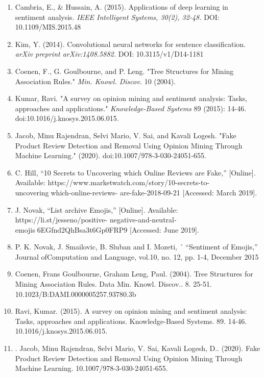 \begin{enumerate}
    \item Cambria, E., & Hussain, A. (2015). Applications of deep learning in sentiment analysis. \textit{IEEE Intelligent Systems, 30(2), 32-48.}  DOI: 10.1109/MIS.2015.48
    \item Kim, Y. (2014). Convolutional neural networks for sentence classification. \textit{arXiv preprint arXiv:1408.5882.}  DOI: 10.3115/v1/D14-1181
    \item Coenen, F., G. Goulbourne, and P. Leng. "Tree Structures for Mining Association Rules." \textit{Min. Knowl. Discov.} 10 (2004). 
    \item Kumar, Ravi. "A survey on opinion mining and sentiment analysis: Tasks, approaches and applications." \textit{Knowledge-Based Systems} 89 (2015): 14-46. doi:10.1016/j.knosys.2015.06.015.
    \item Jacob, Minu Rajendran, Selvi Mario, V. Sai, and Kavali Logesh. "Fake Product Review Detection and Removal Using Opinion Mining Through Machine Learning." (2020). doi:10.1007/978-3-030-24051-655.
    \item  C. Hill, “10 Secrets to Uncovering which
Online Reviews are Fake,” [Online]. Available:
https://www.marketwatch.com/story/10-secrets-to-uncoveringwhich-online-reviews- are-fake-2018-09-21 [Accessed: March
2019].
    \item J. Novak, “List archive Emojis,” [Online]. Available:
https://li.st/jesseno/positive- negative-and-neutral-emojis6EGfnd2QhBsa3t6Gp0FRP9 [Accessed: June 2019].
    \item P. K. Novak, J. Smailovic, B. Sluban and I. Mozeti, ´
“Sentiment of Emojis,” Journal ofComputation and Language,
vol.10, no. 12, pp. 1-4, December 2015
    \item Coenen, Frans Goulbourne, Graham Leng,
Paul. (2004). Tree Structures for Mining Association
Rules. Data Min. Knowl. Discov.. 8. 25-51.
10.1023/B:DAMI.0000005257.93780.3b
\item Ravi, Kumar. (2015). A survey on opinion
mining and sentiment analysis: Tasks, approaches and
applications. Knowledge-Based Systems. 89. 14-46.
10.1016/j.knosys.2015.06.015.
\item . Jacob, Minu Rajendran, Selvi Mario, V. Sai, Kavali
Logesh, D.. (2020). Fake Product Review Detection and
Removal Using Opinion Mining Through Machine Learning.
10.1007/978-3-030-24051-655. 
\end{enumerate}